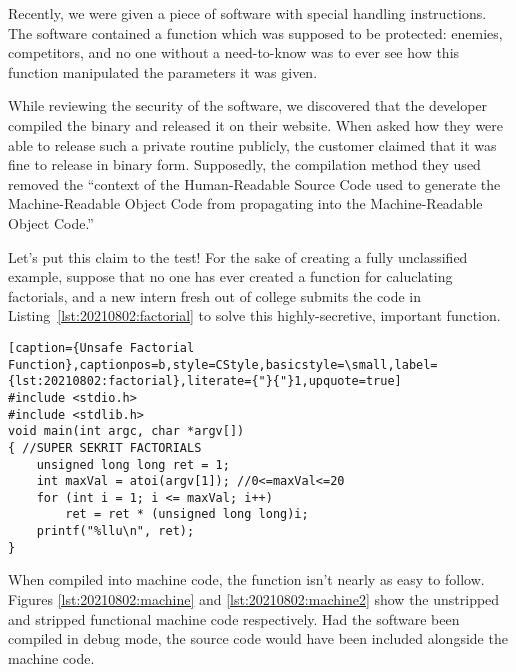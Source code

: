 Recently, we were given a piece of software with special handling instructions. The software contained a function which was supposed to be protected: enemies, competitors, and no one without a need-to-know was to ever see how this function manipulated the parameters it was given.

While reviewing the security of the software, we discovered that the developer compiled the binary and released it on their website. When asked how they were able to release such a private routine publicly, the customer claimed that it was fine to release in binary form. Supposedly, the compilation method they used removed the ``context of the Human-Readable Source Code used to generate the Machine-Readable Object Code from propagating into the Machine-Readable Object Code.''

Let's put this claim to the test! For the sake of creating a fully unclassified example, suppose that no one has ever created a function for caluclating factorials, and a new intern fresh out of college submits the code in Listing~\ref{lst:20210802:factorial} to solve this highly-secretive, important function.
\begin{lstlisting}[caption={Unsafe Factorial Function},captionpos=b,style=CStyle,basicstyle=\small,label={lst:20210802:factorial},literate={"}{"}1,upquote=true]
#include <stdio.h>
#include <stdlib.h>
void main(int argc, char *argv[])
{ //SUPER SEKRIT FACTORIALS
	unsigned long long ret = 1;
	int maxVal = atoi(argv[1]); //0<=maxVal<=20
	for (int i = 1; i <= maxVal; i++)
		ret = ret * (unsigned long long)i;
	printf("%llu\n", ret);
}
\end{lstlisting}

When compiled into machine code, the function isn't nearly as easy to follow. Figures \ref{lst:20210802:machine} and \ref{lst:20210802:machine2} show the unstripped and stripped functional machine code respectively. Had the software been compiled in debug mode, the source code would have been included alongside the machine code.

